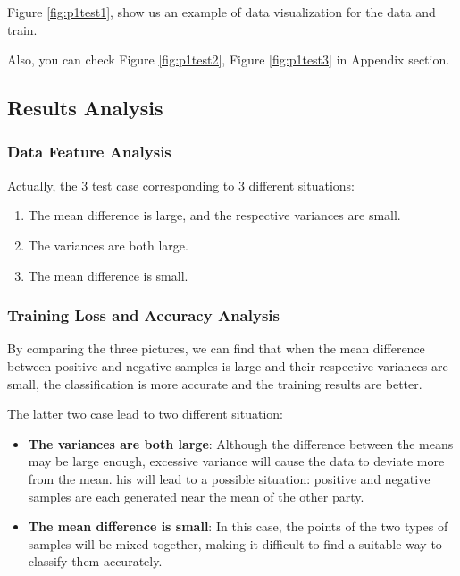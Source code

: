 Figure \ref{fig:p1test1},  show us an example of data visualization for the data and train. 

Also, you can check Figure \ref{fig:p1test2}, Figure \ref{fig:p1test3} in Appendix section. 

\subsection{Results Analysis}

\subsubsection{Data Feature Analysis}

Actually, the 3 test case corresponding to 3 different situations:

\begin{enumerate}
    \item The mean difference is large, and the respective variances are small.
    \item The variances are both large.
    \item The mean difference is small.
\end{enumerate}

\subsubsection{Training Loss and Accuracy Analysis}

By comparing the three pictures,
we can find that when the mean difference between positive and negative samples is large and their respective variances are small,
the classification is more accurate and the training results are better.

The latter two case lead to two different situation:

\begin{itemize}
    \item {\textbf{The variances are both large}: 
    Although the difference between the means may be large enough,
    excessive variance will cause the data to deviate more from the mean.
    his will lead to a possible situation: positive and negative samples are each generated near the mean of the other party.
    }
    \item {\textbf{The mean difference is small}:
     In this case, the points of the two types of samples will be mixed together,
     making it difficult to find a suitable way to classify them accurately.
    }
\end{itemize}

